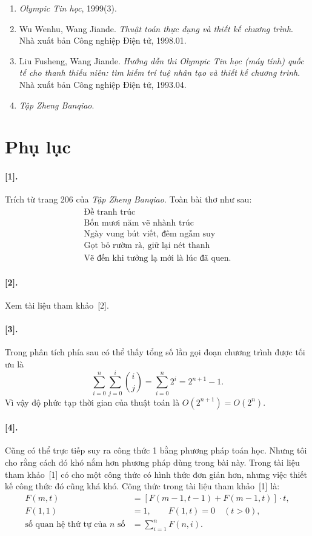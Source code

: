 \documentclass[11pt]{article}
\begin{document}
\begin{enumerate}
  \item \textit{Olympic Tin học}, 1999(3).
  \item Wu Wenhu, Wang Jiande. \textit{Thuật toán thực dụng và thiết kế chương
  trình}. Nhà xuất bản Công nghiệp Điện tử, 1998.01.
  \item Liu Fusheng, Wang Jiande. \textit{Hướng dẫn thi Olympic Tin học
  (máy tính) quốc tế cho thanh thiếu niên: tìm kiếm trí tuệ nhân tạo và thiết
  kế chương trình}. Nhà xuất bản Công nghiệp Điện tử, 1993.04.
  \item \textit{Tập Zheng Banqiao}.
\end{enumerate}

\section*{Phụ lục}

\paragraph{[1].}
Trích từ trang 206 của \textit{Tập Zheng Banqiao}. Toàn bài thơ như sau:
\[
\begin{array}{c}
\text{Đề tranh trúc}\\
\text{Bốn mươi năm vẽ nhành trúc}\\
\text{Ngày vung bút viết, đêm ngẫm suy}\\
\text{Gọt bỏ rườm rà, giữ lại nét thanh}\\
\text{Vẽ đến khi tưởng lạ mới là lúc đã quen.}
\end{array}
\]

\paragraph{[2].}
Xem tài liệu tham khảo~[2].

\paragraph{[3].}
Trong phân tích phía sau có thể thấy tổng số lần gọi đoạn chương trình được
tối ưu là
\[
  \sum_{i=0}^{n}\sum_{j=0}^{i}\binom{i}{j}
  = \sum_{i=0}^{n}2^i
  = 2^{n+1}-1.
\]
Vì vậy độ phức tạp thời gian của thuật toán là \(O(2^{n+1})=O(2^n)\).

\paragraph{[4].}
Cũng có thể trực tiếp suy ra công thức 1 bằng phương pháp toán học. Nhưng tôi
cho rằng cách đó khó nắm hơn phương pháp dùng trong bài này. Trong tài liệu
tham khảo~[1] có cho một công thức có hình thức đơn giản hơn, nhưng việc
thiết kế công thức đó cũng khá khó. Công thức trong tài liệu tham khảo~[1] là:
\[
\begin{aligned}
F(m,t) &= [F(m-1,t-1)+F(m-1,t)]\cdot t,\\
F(1,1)&=1,\qquad F(1,t)=0\quad (t>0),\\
\text{số quan hệ thứ tự của }n\text{ số} &= \sum_{i=1}^{n}F(n,i).
\end{aligned}
\]
\end{document}
